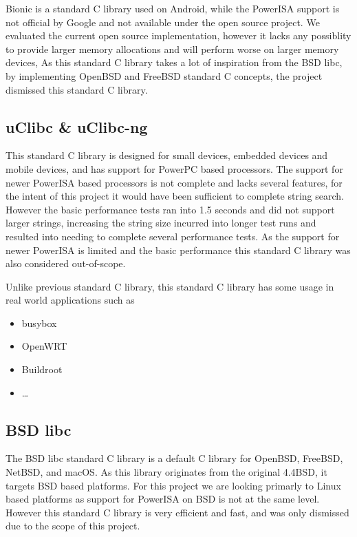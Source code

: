 Bionic is a standard C library used on Android, while the PowerISA support is not official by Google and not available under the open source project.
We evaluated the current open source implementation, however it lacks any possiblity to provide larger memory allocations
and will perform worse on larger memory devices,
As this standard C library takes a lot of inspiration from the BSD libc, by implementing OpenBSD and FreeBSD standard C concepts,
the project dismissed this standard C library.
\par

\subsection{uClibc \& uClibc-ng}
\label{content:uclibc}

This standard C library is designed for small devices, embedded devices and mobile devices, and has support for PowerPC based processors.
The support for newer PowerISA based processors is not complete and lacks several features,
for the intent of this project it would have been sufficient to complete string search.
However the basic performance tests ran into 1.5 seconds and did not support larger strings,
increasing the string size incurred into longer test runs and resulted into needing to complete several performance tests.
As the support for newer PowerISA is limited and the basic performance this standard C library was also considered out-of-scope.
\par

Unlike previous standard C library, this standard C library has some usage in real world applications such as
\begin{itemize}
\item
busybox
\item
OpenWRT
\item
Buildroot
\item
\ldots
\end{itemize}

\subsection{BSD libc}

The BSD libc standard C library is a default C library for OpenBSD, FreeBSD, NetBSD, and macOS.
As this library originates from the original 4.4BSD, it targets BSD based platforms.
For this project we are looking primarly to Linux based platforms as support for PowerISA on BSD is not at the same level.
However this standard C library is very efficient and fast, and was only dismissed due to the scope of this project.
\par

